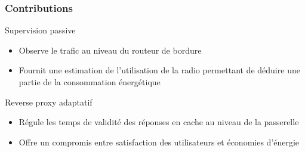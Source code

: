 
\begin{frame}\frametitle{Contributions}

  \begin{alertblock}{Supervision passive}
    \begin{itemize}
      \item Observe le trafic au niveau du routeur de bordure
      \item Fournit une estimation de l'utilisation de la radio permettant de déduire une partie de la consommation énergétique
    \end{itemize}
  \end{alertblock}

  \begin{alertblock}{Reverse proxy adaptatif}
    \begin{itemize}
      \item Régule les temps de validité des réponses en cache au niveau de la passerelle
      \item Offre un compromis entre satisfaction des utilisateurs et économies d'énergie
    \end{itemize}
  \end{alertblock}


\end{frame}